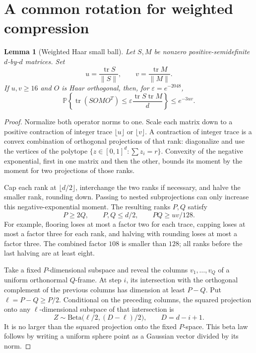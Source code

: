 \documentclass[11pt]{article}
\newtheorem{lemma}[theorem]{Lemma}
\theoremstyle{remark}\newtheorem{remark}[theorem]{Remark}
\newcommand{\Prb}{\mathbb P}
\newcommand{\tr}{\operatorname{tr}}
\newcommand{\eps}{\varepsilon}
\begin{document}
\section{A common rotation for weighted compression}\label{sec:haar}
\begin{lemma}[Weighted Haar small ball]\label{le:haar}
Let $S,M$ be nonzero positive-semidefinite $d$-by-$d$ matrices. Set
\[
 u=\frac{\tr S}{\|S\|},\qquad v=\frac{\tr M}{\|M\|}.
\]
If $u,v\ge16$ and $O$ is Haar orthogonal, then, for $\eps=e^{-2048}$,
\begin{equation}\label{eq:haar}
 \Prb\left\{\tr(SOMO^T)\le
 \eps\frac{\tr S\tr M}{d}\right\}\le e^{-3uv}.
\end{equation}
\end{lemma}
\begin{proof}
Normalize both operator norms to one. Scale each matrix down to a positive contraction of integer trace $\lfloor u\rfloor$ or $\lfloor v\rfloor$. A contraction of integer trace is a convex combination of orthogonal projections of that rank: diagonalize and use the vertices of the polytope $\{z\in[0,1]^d:\sum z_i=r\}$. Convexity of the negative exponential, first in one matrix and then the other, bounds its moment by the moment for two projections of those ranks.

Cap each rank at $\lfloor d/2\rfloor$, interchange the two ranks if necessary, and halve the smaller rank, rounding down. Passing to nested subprojections can only increase this negative-exponential moment. The resulting ranks $P,Q$ satisfy
\[
 P\ge2Q,\qquad P,Q\le d/2,\qquad PQ\ge uv/128.
\]
For example, flooring loses at most a factor two for each trace, capping loses at most a factor three for each rank, and halving with rounding loses at most a factor three. The combined factor $108$ is smaller than $128$; all ranks before the last halving are at least eight.

Take a fixed $P$-dimensional subspace and reveal the columns $v_1,\ldots,v_Q$ of a uniform orthonormal $Q$-frame. At step $i$, its intersection with the orthogonal complement of the previous columns has dimension at least $P-Q$. Put $\ell=P-Q\ge P/2$. Conditional on the preceding columns, the squared projection onto any $\ell$-dimensional subspace of that intersection is
\[
 Z\sim\mathrm{Beta}\bigl(\ell/2,(D-\ell)/2\bigr),\qquad D=d-i+1.
\]
It is no larger than the squared projection onto the fixed $P$-space. This beta law follows by writing a uniform sphere point as a Gaussian vector divided by its norm.


\end{proof}
\end{document}
